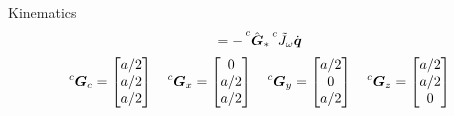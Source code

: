 \begin{frame}[shrink=15]{Kinematics}
\[  = -\prescript{c}{}{\unitvec{G}}_* \prescript{c}{}{\tilde{J}_{\omega}} \dot{\vec{q}}
  \]
  \[
  \prescript{c}{}{\vec{G}}_{c} = 
  \begin{bmatrix}
    a/2 \\
    a/2 \\
    a/2
  \end{bmatrix} \quad
  \prescript{c}{}{\vec{G}}_x = 
  \begin{bmatrix}
    0 \\
    a/2 \\
    a/2
  \end{bmatrix} \quad
  \prescript{c}{}{\vec{G}}_y = 
  \begin{bmatrix}
    a/2 \\
    0 \\
    a/2
  \end{bmatrix} \quad
  \prescript{c}{}{\vec{G}}_z = 
  \begin{bmatrix}
    a/2 \\
    a/2 \\
    0
  \end{bmatrix}
  \]
\end{frame}

